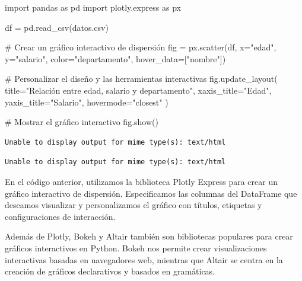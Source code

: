 \documentclass[
  a4paper,
]{article}
\newenvironment{Shaded}{}{}
\newcommand{\CommentTok}[1]{\textcolor[rgb]{0.42,0.45,0.49}{#1}}
\newcommand{\ImportTok}[1]{\textcolor[rgb]{0.01,0.18,0.38}{#1}}
\newcommand{\NormalTok}[1]{\textcolor[rgb]{0.14,0.16,0.18}{#1}}
\newcommand{\OperatorTok}[1]{\textcolor[rgb]{0.14,0.16,0.18}{#1}}
\newcommand{\StringTok}[1]{\textcolor[rgb]{0.01,0.18,0.38}{#1}}
\begin{document}
\begin{Shaded}
\begin{Highlighting}[]
\ImportTok{import}\NormalTok{ pandas }\ImportTok{as}\NormalTok{ pd}
\ImportTok{import}\NormalTok{ plotly.express }\ImportTok{as}\NormalTok{ px}

\NormalTok{df }\OperatorTok{=}\NormalTok{ pd.read\_csv(}\StringTok{\textquotesingle{}datos.csv\textquotesingle{}}\NormalTok{)}

\CommentTok{\# Crear un gráfico interactivo de dispersión}
\NormalTok{fig }\OperatorTok{=}\NormalTok{ px.scatter(df, x}\OperatorTok{=}\StringTok{"edad"}\NormalTok{, y}\OperatorTok{=}\StringTok{"salario"}\NormalTok{, color}\OperatorTok{=}\StringTok{"departamento"}\NormalTok{, hover\_data}\OperatorTok{=}\NormalTok{[}\StringTok{"nombre"}\NormalTok{])}

\CommentTok{\# Personalizar el diseño y las herramientas interactivas}
\NormalTok{fig.update\_layout(}
\NormalTok{    title}\OperatorTok{=}\StringTok{"Relación entre edad, salario y departamento"}\NormalTok{,}
\NormalTok{    xaxis\_title}\OperatorTok{=}\StringTok{"Edad"}\NormalTok{,}
\NormalTok{    yaxis\_title}\OperatorTok{=}\StringTok{"Salario"}\NormalTok{,}
\NormalTok{    hovermode}\OperatorTok{=}\StringTok{"closest"}
\NormalTok{)}

\CommentTok{\# Mostrar el gráfico interactivo}
\NormalTok{fig.show()}
\end{Highlighting}
\end{Shaded}

\begin{verbatim}
Unable to display output for mime type(s): text/html
\end{verbatim}

\begin{verbatim}
Unable to display output for mime type(s): text/html
\end{verbatim}

En el código anterior, utilizamos la biblioteca Plotly Express para
crear un gráfico interactivo de dispersión. Especificamos las columnas
del DataFrame que deseamos visualizar y personalizamos el gráfico con
títulos, etiquetas y configuraciones de interacción.

Además de Plotly, Bokeh y Altair también son bibliotecas populares para
crear gráficos interactivos en Python. Bokeh nos permite crear
visualizaciones interactivas basadas en navegadores web, mientras que
Altair se centra en la creación de gráficos declarativos y basados en
gramáticas.
\end{document}

